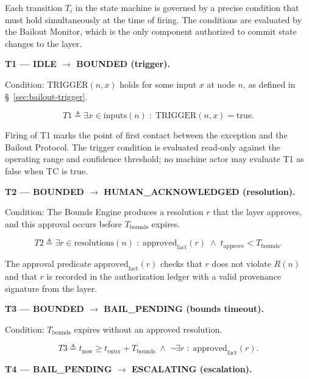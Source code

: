 Each transition $T_i$ in the state machine is governed by a precise condition that must hold simultaneously at the time of firing. The conditions are evaluated by the Bailout Monitor, which is the only component authorized to commit state changes to the \fact{} layer.

\medskip\noindent\textbf{T1 — IDLE $\rightarrow$ BOUNDED (trigger).}

Condition: $\text{TRIGGER}(n, x)$ holds for some input $x$ at node $n$, as defined in \S~\ref{sec:bailout-trigger}.

\begin{equation}
T1 \triangleq \exists x \in \text{inputs}(n) \;:\; \text{TRIGGER}(n, x) = \text{true}. \tag{T1}
\end{equation}

Firing of T1 marks the point of first contact between the exception and the Bailout Protocol. The trigger condition is evaluated read-only against the operating range and confidence threshold; no machine actor may evaluate T1 as false when TC is true.

\medskip\noindent\textbf{T2 — BOUNDED $\rightarrow$ HUMAN\_ACKNOWLEDGED (resolution).}

Condition: The Bounds Engine produces a resolution $r$ that the \fact{} layer approves, and this approval occurs before $T_{\text{bounds}}$ expires.

\begin{equation}
T2 \triangleq \exists r \in \text{resolutions}(n) \;:\; \text{approved}_{\text{fact}}(r) \;\land\; t_{\text{approve}} < T_{\text{bounds}}. \tag{T2}
\end{equation}

The approval predicate $\text{approved}_{\text{fact}}(r)$ checks that $r$ does not violate $R(n)$ and that $r$ is recorded in the authorization ledger with a valid provenance signature from the \bounds{} layer.

\medskip\noindent\textbf{T3 — BOUNDED $\rightarrow$ BAIL\_PENDING (bounds timeout).}

Condition: $T_{\text{bounds}}$ expires without an approved resolution.

\begin{equation}
T3 \triangleq t_{\text{now}} \geq t_{\text{enter}} + T_{\text{bounds}} \;\land\; \neg\exists r \;:\; \text{approved}_{\text{fact}}(r). \tag{T3}
\end{equation}

\medskip\noindent\textbf{T4 — BAIL\_PENDING $\rightarrow$ ESCALATING (escalation).}

